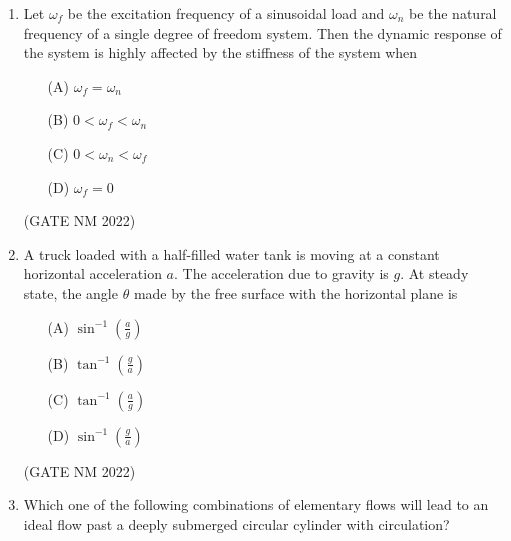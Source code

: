 \documentclass[journal,12pt,onecolumn]{IEEEtran}
\theoremstyle{remark}
\begin{document}
\begin{enumerate}
\begin{multicols}{4}
	\end{multicols}

\hfill(GATE NM 2022)




\item  Let $\omega_f$ be the excitation frequency of a sinusoidal load and $\omega_n$ be the natural frequency of a single degree of freedom system. Then the dynamic response of the system is highly affected by the stiffness of the system when

	\begin{multicols}{2}

\begin{enumerate}
    \item[(A)] $\omega_f = \omega_n$
    \item[(B)] $0 < \omega_f < \omega_n$
    \item[(C)] $0 < \omega_n < \omega_f$
    \item[(D)] $\omega_f = 0$
\end{enumerate}

	\end{multicols}

\hfill(GATE NM 2022)








\item  A truck loaded with a half-filled water tank is moving at a constant horizontal acceleration $a$. The acceleration due to gravity is $g$. At steady state, the angle $\theta$ made by the free surface with the horizontal plane is

	\begin{multicols}{4}

\begin{enumerate}
    \item[(A)] $\sin^{-1}\!\left(\frac{a}{g}\right)$
    \item[(B)] $\tan^{-1}\!\left(\frac{g}{a}\right)$
    \item[(C)] $\tan^{-1}\!\left(\frac{a}{g}\right)$
    \item[(D)] $\sin^{-1}\!\left(\frac{g}{a}\right)$
\end{enumerate}

	\end{multicols}

\hfill(GATE NM 2022)





\item  Which one of the following combinations of elementary flows will lead to an ideal flow past a deeply submerged circular cylinder with circulation?


\end{enumerate}
\end{document}
